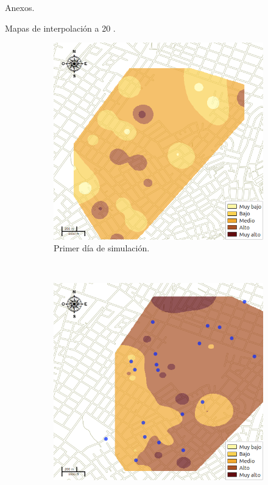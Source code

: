 \begin{frame}[c,plain]{}
    \begin{center}
    Anexos.
    \end{center}
\end{frame}


\begin{frame}[t]{Mapas de interpolación a 20 \textcelsius.}
    \begin{figure}
    \begin{subfigure}[b]{0.45\textwidth}
        \includegraphics[width=\textwidth]{../book/capitulo-6/graphics/raster/temp-20-0.png}
        \caption{ Primer día de simulación.}
    \end{subfigure}
    ~~~~
    \begin{subfigure}[b]{0.45\textwidth}
        \includegraphics[width=\textwidth]{../book/capitulo-6/graphics/raster/temp-20-38.png}

\end{subfigure}
\end{figure}
\end{frame}
